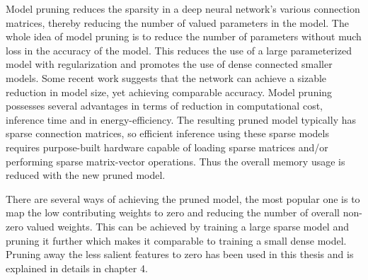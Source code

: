 Model pruning reduces the sparsity in a deep neural network's
various connection matrices, thereby reducing the number of valued parameters in the model. The whole idea of model pruning is to reduce the number of parameters without much loss in the accuracy of the model. This reduces the use of a large parameterized model with regularization and promotes the use of dense connected smaller models. Some recent work suggests \cite{DBLP:journals/corr/HanMD15} \cite{DBLP:journals/corr/NarangDSE17} that the network can achieve a sizable reduction in model size, yet achieving comparable accuracy. 
Model pruning possesses several advantages in terms of reduction in computational cost, inference time and in energy-efficiency. The resulting pruned model typically has sparse connection matrices, so
efficient inference using these sparse models requires purpose-built hardware capable of loading sparse matrices and/or performing sparse matrix-vector operations. Thus the overall memory usage is reduced with the new pruned model. 


There are several ways of achieving the pruned model, the most popular one is to map the low contributing weights to zero and reducing the number of overall non-zero valued weights. This can be achieved by training a large sparse model and pruning it further which makes it comparable to training a small dense model. Pruning away the less salient features to zero has been used in this thesis and is explained in details in chapter 4. 


